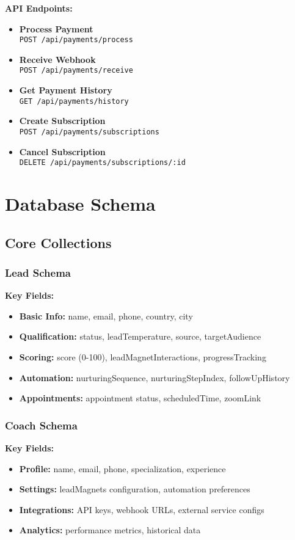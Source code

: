 \documentclass[12pt,a4paper]{article}
\newcommand{\apiendpoint}[2]{\textbf{#1} \\ \texttt{#2}}
\begin{document}
\textbf{API Endpoints:}
\begin{itemize}
    \item \apiendpoint{Process Payment}{POST /api/payments/process}
    \item \apiendpoint{Receive Webhook}{POST /api/payments/receive}
    \item \apiendpoint{Get Payment History}{GET /api/payments/history}
    \item \apiendpoint{Create Subscription}{POST /api/payments/subscriptions}
    \item \apiendpoint{Cancel Subscription}{DELETE /api/payments/subscriptions/:id}
\end{itemize}

\section{Database Schema}

\subsection{Core Collections}

\subsubsection{Lead Schema}
\textbf{Key Fields:}
\begin{itemize}
    \item \textbf{Basic Info:} name, email, phone, country, city
    \item \textbf{Qualification:} status, leadTemperature, source, targetAudience
    \item \textbf{Scoring:} score (0-100), leadMagnetInteractions, progressTracking
    \item \textbf{Automation:} nurturingSequence, nurturingStepIndex, followUpHistory
    \item \textbf{Appointments:} appointment status, scheduledTime, zoomLink
\end{itemize}

\subsubsection{Coach Schema}
\textbf{Key Fields:}
\begin{itemize}
    \item \textbf{Profile:} name, email, phone, specialization, experience
    \item \textbf{Settings:} leadMagnets configuration, automation preferences
    \item \textbf{Integrations:} API keys, webhook URLs, external service configs
    \item \textbf{Analytics:} performance metrics, historical data
\end{itemize}
\end{document}
